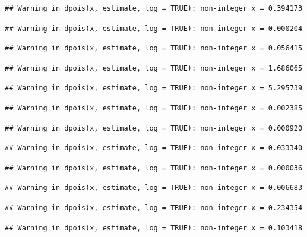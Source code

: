 \documentclass[]{article}
\begin{document}
\begin{verbatim}
## Warning in dpois(x, estimate, log = TRUE): non-integer x = 0.394173
\end{verbatim}

\begin{verbatim}
## Warning in dpois(x, estimate, log = TRUE): non-integer x = 0.000204
\end{verbatim}

\begin{verbatim}
## Warning in dpois(x, estimate, log = TRUE): non-integer x = 0.056415
\end{verbatim}

\begin{verbatim}
## Warning in dpois(x, estimate, log = TRUE): non-integer x = 1.686065
\end{verbatim}

\begin{verbatim}
## Warning in dpois(x, estimate, log = TRUE): non-integer x = 5.295739
\end{verbatim}

\begin{verbatim}
## Warning in dpois(x, estimate, log = TRUE): non-integer x = 0.002385
\end{verbatim}

\begin{verbatim}
## Warning in dpois(x, estimate, log = TRUE): non-integer x = 0.000920
\end{verbatim}

\begin{verbatim}
## Warning in dpois(x, estimate, log = TRUE): non-integer x = 0.033340
\end{verbatim}

\begin{verbatim}
## Warning in dpois(x, estimate, log = TRUE): non-integer x = 0.000036
\end{verbatim}

\begin{verbatim}
## Warning in dpois(x, estimate, log = TRUE): non-integer x = 0.006683
\end{verbatim}

\begin{verbatim}
## Warning in dpois(x, estimate, log = TRUE): non-integer x = 0.234354
\end{verbatim}

\begin{verbatim}
## Warning in dpois(x, estimate, log = TRUE): non-integer x = 0.103418
\end{verbatim}
\end{document}
